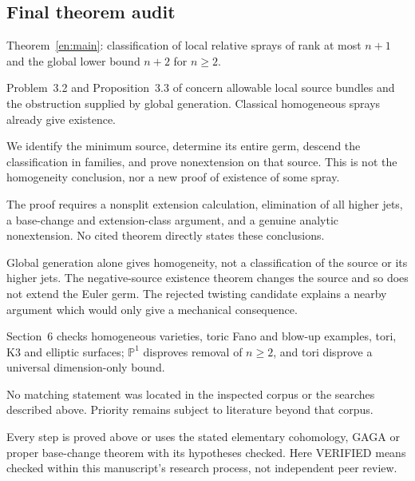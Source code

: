 \documentclass[12pt]{amsart}
\theoremstyle{definition}
\theoremstyle{remark}
\numberwithin{equation}{section}
\newcommand{\mP}{\mathbb{P}}
\begin{document}
\subsection{Final theorem audit}
\begin{description}[style=nextline,leftmargin=0pt,labelwidth=0pt,labelsep=0pt]
\item[Main theorem.] Theorem~\ref{en:main}: classification of local relative sprays of rank at most $n+1$ and the global lower bound $n+2$ for $n\geq2$.
\item[Nearest known result.] Problem~3.2 and Proposition~3.3 of \cite{en:FLell} concern allowable local source bundles and the obstruction supplied by global generation. Classical homogeneous sprays already give existence.
\item[Precise difference.] We identify the minimum source, determine its entire germ, descend the classification in families, and prove nonextension on that source. This is not the homogeneity conclusion, nor a new proof of existence of some spray.
\item[Why nontrivial.] The proof requires a nonsplit extension calculation, elimination of all higher jets, a base-change and extension-class argument, and a genuine analytic nonextension. No cited theorem directly states these conclusions.
\item[Immediate consequence check.] Global generation alone gives homogeneity, not a classification of the source or its higher jets. The negative-source existence theorem changes the source and so does not extend the Euler germ. The rejected twisting candidate explains a nearby argument which would only give a mechanical consequence.
\item[Counterexample search.] Section~6 checks homogeneous varieties, toric Fano and blow-up examples, tori, K3 and elliptic surfaces; $\mP^1$ disproves removal of $n\geq2$, and tori disprove a universal dimension-only bound.
\item[Novelty search.] No matching statement was located in the inspected corpus or the searches described above. Priority remains subject to literature beyond that corpus.
\item[Proof status: VERIFIED.] Every step is proved above or uses the stated elementary cohomology, GAGA or proper base-change theorem with its hypotheses checked. Here VERIFIED means checked within this manuscript's research process, not independent peer review.
\end{description}
\end{document}
